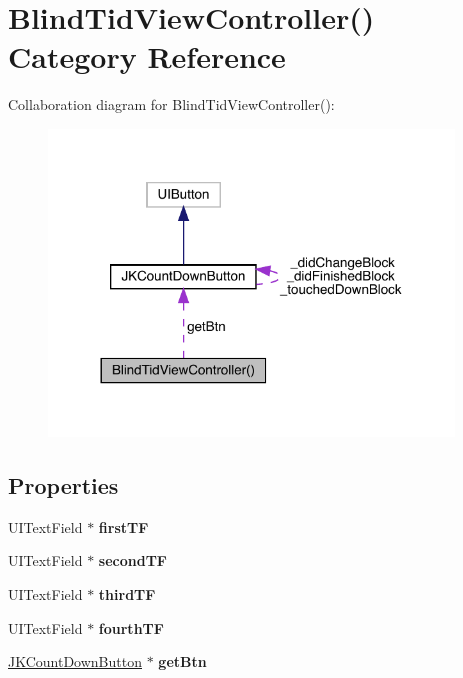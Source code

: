 \hypertarget{category_blind_tid_view_controller_07_08}{}\section{Blind\+Tid\+View\+Controller() Category Reference}
\label{category_blind_tid_view_controller_07_08}


Collaboration diagram for Blind\+Tid\+View\+Controller()\+:\nopagebreak
\begin{figure}[H]
\begin{center}
\leavevmode
\includegraphics[width=305pt]{category_blind_tid_view_controller_07_08__coll__graph}
\end{center}
\end{figure}
\subsection*{Properties}
\begin{DoxyCompactItemize}
\item 
\mbox{\label{category_blind_tid_view_controller_07_08_a6cba30f6ed5f0b65e327706ac1f31aa2}} 
U\+I\+Text\+Field $\ast$ {\bfseries first\+TF}
\item 
\mbox{\label{category_blind_tid_view_controller_07_08_a90a1274c348a1a880f6cd24d980612e3}} 
U\+I\+Text\+Field $\ast$ {\bfseries second\+TF}
\item 
\mbox{\label{category_blind_tid_view_controller_07_08_a5979316547ece5095fb85916effe1cc7}} 
U\+I\+Text\+Field $\ast$ {\bfseries third\+TF}
\item 
\mbox{\label{category_blind_tid_view_controller_07_08_a84a53ec4ebfe8db3488a780ca7f1f934}} 
U\+I\+Text\+Field $\ast$ {\bfseries fourth\+TF}
\item 
\mbox{\label{category_blind_tid_view_controller_07_08_a12830e491edd5ff3e7b769b6af0b5ac4}} 
\mbox{\hyperlink{interface_j_k_count_down_button}{J\+K\+Count\+Down\+Button}} $\ast$ {\bfseries get\+Btn}
\end{DoxyCompactItemize}


